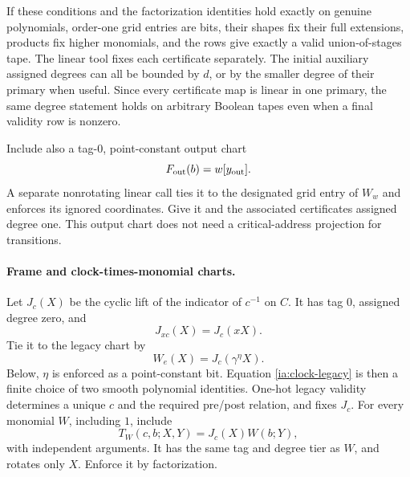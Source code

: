 If these conditions and the factorization identities hold exactly
on genuine polynomials, order-one grid entries are bits, their
shapes fix their full extensions, products fix higher monomials,
and the rows give exactly a valid union-of-stages tape.  The linear
tool fixes each certificate separately.  The initial auxiliary
assigned degrees can all be bounded by $d$, or by the smaller
degree of their primary when useful.  Since every certificate map
is linear in one primary, the same degree statement holds on
arbitrary Boolean tapes even when a final validity row is nonzero.

Include also a tag-$0$, point-constant output chart
\begin{equation}
 F_{\rm out}(b)=w[y_{\rm out}].                    \label{ia:output-chart}
\end{equation}
A separate nonrotating linear call ties it to the designated grid
entry of $W_w$ and enforces its ignored coordinates.  Give it and
the associated certificates assigned degree one.  This output chart
does not need a critical-address projection for transitions.

\paragraph{Frame and clock-times-monomial charts.}
Let $J_c(X)$ be the cyclic lift of the indicator of $c^{-1}$ on
$C$.  It has tag $0$, assigned degree zero, and
\begin{equation}
 J_{xc}(X)=J_c(xX).                                \label{ia:clock-covariance}
\end{equation}
Tie it to the legacy chart by
\begin{equation}
 W_e(X)=J_c(\gamma^\eta X).                        \label{ia:clock-legacy}
\end{equation}
Below, $\eta$ is enforced as a point-constant bit.  Equation
\eqref{ia:clock-legacy} is then a finite choice of two smooth
polynomial identities.  One-hot legacy validity determines a unique
$c$ and the required pre/post relation, and fixes $J_c$.  For every
monomial $W$, including $1$, include
\begin{equation}
 T_W(c,b;X,Y)=J_c(X)W(b;Y),                         \label{ia:clock-monomial}
\end{equation}
with independent arguments.  It has the same tag and degree tier as
$W$, and rotates only $X$.  Enforce it by factorization.

